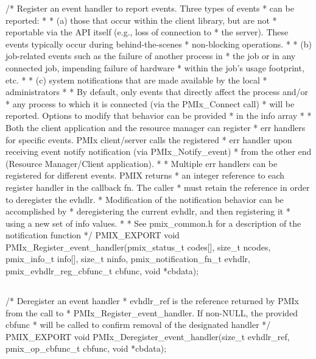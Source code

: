 \cspecificstart
\begin{codepar}
/* Register an event handler to report events. Three types of events
 * can be reported:
 *
 * (a) those that occur within the client library, but are not
 *     reportable via the API itself (e.g., loss of connection to
 *     the server). These events typically occur during behind-the-scenes
 *     non-blocking operations.
 *
 * (b) job-related events such as the failure of another process in
 *     the job or in any connected job, impending failure of hardware
 *     within the job's usage footprint, etc.
 *
 * (c) system notifications that are made available by the local
 *     administrators
 *
 * By default, only events that directly affect the process and/or
 * any process to which it is connected (via the PMIx_Connect call)
 * will be reported. Options to modify that behavior can be provided
 * in the info array
 *
 * Both the client application and the resource manager can register
 * err handlers for specific events. PMIx client/server calls the registered
 * err handler upon receiving event notify notification (via PMIx_Notify_event)
 * from the other end (Resource Manager/Client application).
 *
 * Multiple err handlers can be registered for different events. PMIX returns
 * an integer reference to each register handler in the callback fn. The caller
 * must retain the reference in order to deregister the evhdlr.
 * Modification of the notification behavior can be accomplished by
 * deregistering the current evhdlr, and then registering it
 * using a new set of info values.
 *
 * See pmix_common.h for a description of the notification function */
PMIX_EXPORT void PMIx_Register_event_handler(pmix_status_t codes[], size_t ncodes,
                                             pmix_info_t info[], size_t ninfo,
                                             pmix_notification_fn_t evhdlr,
                                             pmix_evhdlr_reg_cbfunc_t cbfunc,
                                             void *cbdata);
\end{codepar}
\cspecificend


\subsection{}

\cspecificstart
\begin{codepar}
/* Deregister an event handler
 * evhdlr_ref is the reference returned by PMIx from the call to
 * PMIx_Register_event_handler. If non-NULL, the provided cbfunc
 * will be called to confirm removal of the designated handler */
PMIX_EXPORT void PMIx_Deregister_event_handler(size_t evhdlr_ref,
                                               pmix_op_cbfunc_t cbfunc,
                                               void *cbdata);
\end{codepar}
\cspecificend


